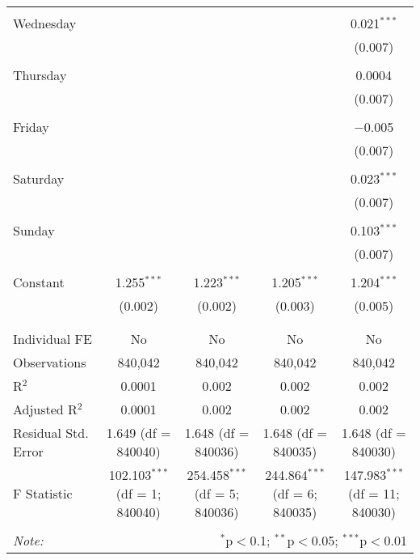 \documentclass[
]{article}
\begin{document}
\begin{table}[!htbp]
{\begin{tabular}{@{\extracolsep{5pt}}lcccc}
  & & & & \\ 
 Wednesday &  &  &  & 0.021$^{***}$ \\ 
  &  &  &  & (0.007) \\ 
  & & & & \\ 
 Thursday &  &  &  & 0.0004 \\ 
  &  &  &  & (0.007) \\ 
  & & & & \\ 
 Friday &  &  &  & $-$0.005 \\ 
  &  &  &  & (0.007) \\ 
  & & & & \\ 
 Saturday &  &  &  & 0.023$^{***}$ \\ 
  &  &  &  & (0.007) \\ 
  & & & & \\ 
 Sunday &  &  &  & 0.103$^{***}$ \\ 
  &  &  &  & (0.007) \\ 
  & & & & \\ 
 Constant & 1.255$^{***}$ & 1.223$^{***}$ & 1.205$^{***}$ & 1.204$^{***}$ \\ 
  & (0.002) & (0.002) & (0.003) & (0.005) \\ 
  & & & & \\ 
\hline \\[-1.8ex] 
Individual FE & No & No & No & No \\ 
Observations & 840,042 & 840,042 & 840,042 & 840,042 \\ 
R$^{2}$ & 0.0001 & 0.002 & 0.002 & 0.002 \\ 
Adjusted R$^{2}$ & 0.0001 & 0.002 & 0.002 & 0.002 \\ 
Residual Std. Error & 1.649 (df = 840040) & 1.648 (df = 840036) & 1.648 (df = 840035) & 1.648 (df = 840030) \\ 
F Statistic & 102.103$^{***}$ (df = 1; 840040) & 254.458$^{***}$ (df = 5; 840036) & 244.864$^{***}$ (df = 6; 840035) & 147.983$^{***}$ (df = 11; 840030) \\ 
\hline 
\hline \\[-1.8ex] 
\textit{Note:}  & \multicolumn{4}{r}{$^{*}$p$<$0.1; $^{**}$p$<$0.05; $^{***}$p$<$0.01} \\ 
\end{tabular}
} 
\end{table} 
\newpage
\end{document}
